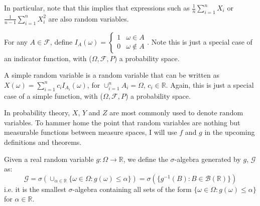 \documentclass[11pt]{scrartcl}
\begin{document}
\begin{remark}
In particular, note that this implies that expressions such as 
$\frac{1}{n}\sum_{i=1}^n X_i$ or $\frac{1}{n-1}\sum_{i=1}^n X_i^2$ are also random variables.
\end{remark}{}

\begin{definition}
For any $A \in \mathcal{F}$, define
$I_A(\omega) = \begin{cases} 
1 & \omega \in A \\
 0 & \omega \notin A 
\end{cases}$.
Note this is just a special case of an indicator function, with ($\Omega,\mathcal{F},P$) a probability space.
\end{definition}{}

\begin{definition}
A simple random variable is a random variable that can be written as $X(\omega) = \sum_{i=1}^n c_i I_{A_i}(\omega)$, for $\cup_{i=1}^n A_i = \Omega$, $c_i\in \mathbb{R} $.
Again, this is just a special case of a simple function, with ($\Omega,\mathcal{F},P$) a probability space.
\end{definition}{}

\begin{example}

\end{example}{}


\begin{remark}
In probability theory, $X$, $Y$ and $Z$ are most commonly used to denote random variables. To hammer home the point that random variables are nothing but measurable functions between measure spaces, I will use $f$ and $g$ in the upcoming definitions and theorems. 
\end{remark}

\begin{definition}
Given a real random variable $g: \Omega \rightarrow \mathbb{R}$, we define the $\sigma$-algebra generated by $g$, $\mathscr{G}$ as:
$$\mathscr{G} = \sigma(\cup_{\alpha \in \mathbb{R}}\{\omega \in \Omega: g(\omega) \leq \alpha \}) = \sigma(\{g^{-1}(B) : B \in \mathcal{B}(\mathbb{R})\})   $$
i.e. it is the smallest $\sigma$-algebra containing all sets of the form $\{\omega \in \Omega: g(\omega) \leq \alpha \}$ for $\alpha \in \mathbb{R}$.

\end{definition}
\end{document}
